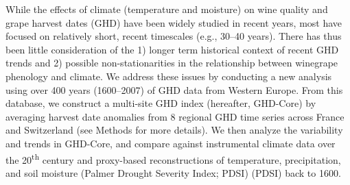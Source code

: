 \documentclass[final]{nature}
\begin{document}
\indent While the effects of climate (temperature\cite{coombe1987,jones2005} and moisture\cite{vanlee2009}) on wine quality and grape harvest dates\cite{odo2012,webb2012} (GHD) have been widely studied in recent years, most have focused on relatively short, recent timescales (e.g., 30--40 years\cite{Duchene:2005bd,tomasi2011,webb2012}). There has thus been little consideration of the 1) longer term historical context of recent GHD trends and 2) possible non-stationarities in the relationship between winegrape phenology and climate. We address these issues by conducting a new analysis using over 400 years (1600--2007) of GHD data from Western Europe\cite{Daux2012}. From this database, we construct a multi-site GHD index (hereafter, GHD-Core) by averaging harvest date anomalies from 8 regional GHD time series across France and Switzerland (see Methods for more details). We then analyze the variability and trends in GHD-Core, and compare against instrumental climate data over the 20\textsuperscript{th} century\cite{Harris2014} and proxy-based reconstructions of temperature\cite{Luterbacher2004}, precipitation\cite{Pauling2006}, and soil moisture (Palmer Drought Severity Index; PDSI)\cite{CookOWDA2015} (PDSI) back to 1600.\\
\end{document}
